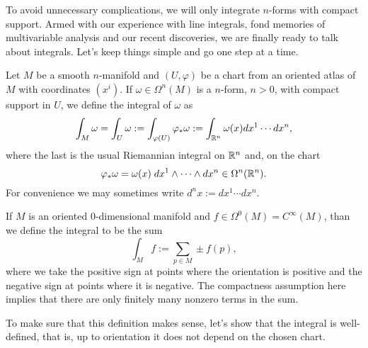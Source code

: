 To avoid unnecessary complications, we will only integrate $n$-forms with compact support.
Armed with our experience with line integrals, fond memories of multivariable analysis and our recent discoveries, we are finally ready to talk about integrals.
Let's keep things simple and go one step at a time.

\begin{definition}\label{def:intnform:chart}
  Let $M$ be a smooth $n$-manifold and $(U,\varphi)$ be a chart from an oriented atlas of $M$ with coordinates $(x^i)$.
  If $\omega\in\Omega^n(M)$ is a $n$-form, $n > 0$, with compact support in $U$, we define the integral of $\omega$ as
  \begin{equation}
    \int_M \omega = \int_U \omega := \int_{\varphi(U)} \varphi_*\omega := \int_{\mathbb{R}^n} \omega(x) d x^1\cdots dx^n,
  \end{equation}
  where the last is the usual Riemannian integral on $\mathbb{R}^n$ and, on the chart
  \begin{equation}
    \varphi_*\omega = \omega(x)\; dx^{1}\wedge \cdots\wedge dx^{n}\in\Omega^n(\mathbb{R}^n).
  \end{equation}
  For convenience we may sometimes write $d^n x := dx^1 \cdots dx^n$.

  If $M$ is an oriented $0$-dimensional manifold and $f\in\Omega^0(M) = C^\infty(M)$, than we define the integral to be the sum
  \begin{equation}
    \int_M f := \sum_{p\in M} \pm f(p),
  \end{equation}
  where we take the positive sign at points where the orientation is positive and the negative sign at points where it is negative.
  The compactness assumption here implies that there are only finitely many nonzero terms in the sum.
\end{definition}

To make sure that this definition makes sense, let's show that the integral is well-defined, that is, up to orientation it does not depend on the chosen chart.

